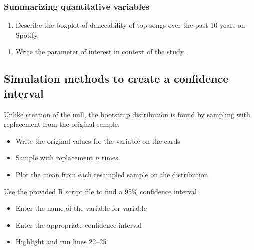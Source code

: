 \documentclass[
]{report}
\providecommand{\tightlist}{%
  \setlength{\itemsep}{0pt}\setlength{\parskip}{0pt}}
\begin{document}
\subsubsection*{Summarizing quantitative variables}\label{summarizing-quantitative-variables-2}

\begin{enumerate}
\def\labelenumi{\arabic{enumi}.}
\tightlist
\item
  Describe the boxplot of danceability of top songs over the past 10 years on Spotify.
\end{enumerate}

\vspace{1in}

\begin{enumerate}
\def\labelenumi{\arabic{enumi}.}
\setcounter{enumi}{1}
\tightlist
\item
  Write the parameter of interest in context of the study.
\end{enumerate}

\vspace{1in}

\subsection*{Simulation methods to create a confidence interval}\label{simulation-methods-to-create-a-confidence-interval}

Unlike creation of the null, the bootstrap distribution is found by sampling with replacement from the original sample.

\begin{itemize}
\item
  Write the original values for the variable on the cards
\item
  Sample with replacement \(n\) times
\item
  Plot the mean from each resampled sample on the distribution
\end{itemize}

Use the provided R script file to find a 95\% confidence interval

\begin{itemize}
\item
  Enter the name of the variable for variable
\item
  Enter the appropriate confidence interval
\item
  Highlight and run lines 22--25
\end{itemize}
\end{document}
